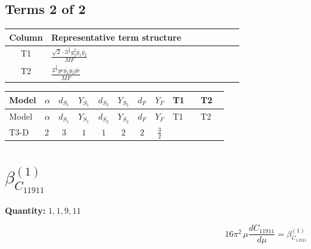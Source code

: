\documentclass[8pt]{article}
\begin{document}
\begin{landscape}
\subsection*{Terms 2 of 2}
\begin{center}
\begin{tabular}{@{}c >{\raggedright\arraybackslash}p{0.82\linewidth}@{}}
\toprule
Column & Representative term structure \\
\midrule
T1 & \(\displaystyle \frac{\sqrt{2} \cdot 3^{\frac{3}{4}} g_{2}^{2} \overline{y_{1}} \overline{y_{2}}}{MF}\) \\
\midrule
T2 & \(\displaystyle \frac{3^{\frac{3}{4}} ye \overline{y_{1}} \overline{y_{2}} \overline{ye}}{MF}\) \\
\midrule
\bottomrule
\end{tabular}
\end{center}
\smallskip
\tiny
\begin{longtable}{@{}llcccccc >{\raggedright\arraybackslash}p{0.21\linewidth} >{\raggedright\arraybackslash}p{0.21\linewidth}@{}}
\toprule
Model & $\alpha$ & $d_{S_1}$ & $Y_{S_1}$ & $d_{S_2}$ & $Y_{S_2}$ & $d_F$ & $Y_F$ & T1 & T2 \\
\midrule
\endfirsthead
\toprule
Model & $\alpha$ & $d_{S_1}$ & $Y_{S_1}$ & $d_{S_2}$ & $Y_{S_2}$ & $d_F$ & $Y_F$ & T1 & T2 \\
\midrule
\endhead
T3-D & $2$ & $3$ & $1$ & $1$ & $2$ & $2$ & $\frac{3}{2}$ & \scriptsize\adjustbox{max width=\linewidth}{$\begin{gathered} - \frac{\sqrt{2} \cdot 3^{\frac{3}{4}} g_{2}^{2} \overline{y_{1}} \overline{y_{2}}}{3 MF}\end{gathered}$} & \scriptsize\adjustbox{max width=\linewidth}{$\begin{gathered} \frac{3^{\frac{3}{4}} ye \overline{y_{1}} \overline{y_{2}} \overline{ye}}{12 MF}\end{gathered}$} \\
\midrule
\bottomrule
\end{longtable}
\clearpage
\section*{$\beta_{C_{11911}}^{(1)}$}
\noindent\textbf{Quantity: }$\mathrm{1,1,9,11}$\par\smallskip
\[16\pi^2\,\mu\frac{d C_{11911}}{d\mu}=\beta_{C_{11911}}^{(1)}\]

\end{landscape}
\end{document}
